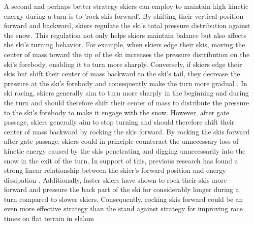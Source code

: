 \documentclass{report}
\begin{document}
A second and perhaps better strategy skiers can employ to maintain high kinetic energy during a turn is to 'rock skis forward'. By shifting their vertical position forward and backward, skiers regulate the ski’s total pressure distribution against the snow\cite{lemaster_skiers_1999, lemaster_ultimate_2010, howe_new_2001}. This regulation not only helps skiers maintain balance but also affects the ski's turning behavior. For example, when skiers edge their skis, moving the center of mass toward the tip of the ski increases the pressure distribution on the ski's forebody, enabling it to turn more sharply. Conversely, if skiers edge their skis but shift their center of mass backward to the ski's tail, they decrease the pressure at the ski's forebody and consequently make the turn more gradual \cite{lemaster_skiers_1999, lemaster_ultimate_2010}. In ski racing, skiers generally aim to turn more sharply in the beginning and during the turn and should therefore shift their center of mass to distribute the pressure to the ski's forebody to make it engage with the snow. However, after gate passage, skiers generally aim to stop turning and should therefore shift their center of mass backward by rocking the skis forward. By rocking the skis forward after gate passage, skiers could in principle counteract the unnecessary loss of kinetic energy caused by the skis penetrating and digging unnecessarily into the snow in the exit of the turn. In support of this, previous research has found a strong linear relationship between the skier's forward position and energy dissipation \cite{reid_turn_2009}. Additionally, faster skiers have shown to rock their skis more forward and pressure the back part of the ski for considerably longer during a turn compared to slower skiers\cite{reid_kinematic_2010, tjorhom_beskrivelse_2007}. Consequently, rocking skis forward could be an even more effective strategy than the stand against strategy for improving race times on flat terrain in slalom 
\end{document}
